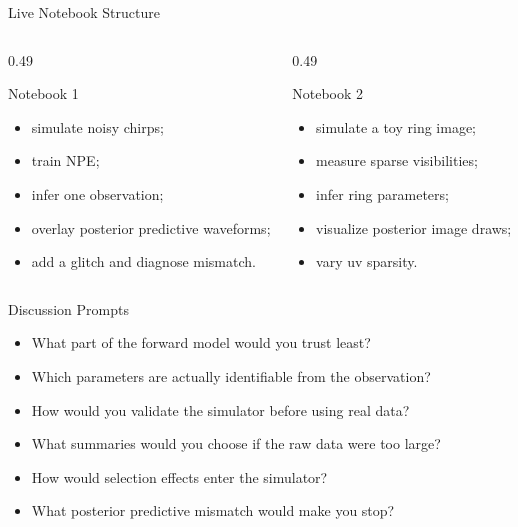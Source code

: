 \documentclass[aspectratio=169,11pt]{beamer}
\newcommand{\tightlist}{\setlength{\itemsep}{0.35em}}
\begin{document}
\begin{frame}{Live Notebook Structure}
  \begin{columns}[T,onlytextwidth]
    \begin{column}{0.49\textwidth}
      \begin{block}{Notebook 1}
        \begin{itemize}\tightlist
          \item simulate noisy chirps;
          \item train NPE;
          \item infer one observation;
          \item overlay posterior predictive waveforms;
          \item add a glitch and diagnose mismatch.
        \end{itemize}
      \end{block}
    \end{column}
    \begin{column}{0.49\textwidth}
      \begin{block}{Notebook 2}
        \begin{itemize}\tightlist
          \item simulate a toy ring image;
          \item measure sparse visibilities;
          \item infer ring parameters;
          \item visualize posterior image draws;
          \item vary uv sparsity.
        \end{itemize}
      \end{block}
    \end{column}
  \end{columns}
\end{frame}

\begin{frame}{Discussion Prompts}
  \begin{itemize}\tightlist
    \item What part of the forward model would you trust least?
    \item Which parameters are actually identifiable from the observation?
    \item How would you validate the simulator before using real data?
    \item What summaries would you choose if the raw data were too large?
    \item How would selection effects enter the simulator?
    \item What posterior predictive mismatch would make you stop?
  \end{itemize}
\end{frame}
\end{document}
